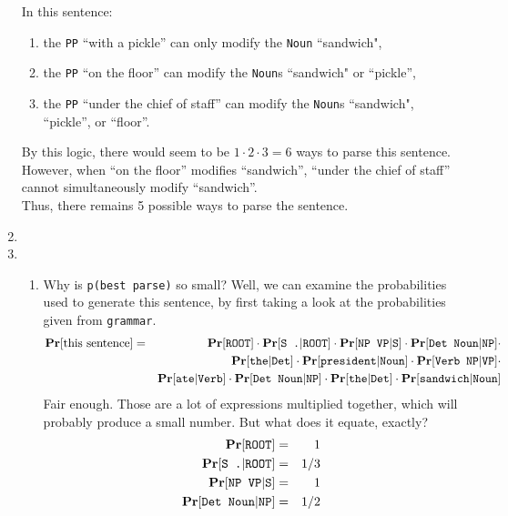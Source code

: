 \documentclass[11pt]{article}
\newcommand{\prob}[1]{\ensuremath{\text{{\bf Pr}$\left[#1\right]$}}}
\newcommand{\code}[1]{\texttt{#1}}
\begin{document}
\begin{enumerate}
	In this sentence:
	\begin{enumerate}[label=(\roman*)]
	\item the \code{PP} ``with a pickle'' can only modify the \code{Noun} ``sandwich",
	\item the \code{PP} ``on the floor'' can modify the \code{Noun}s ``sandwich" or ``pickle'',
	\item the \code{PP} ``under the chief of staff'' can modify the \code{Noun}s ``sandwich", ``pickle'', or ``floor''.
	\end{enumerate}
	By this logic, there would seem to be $1 \cdot 2 \cdot 3 = 6$ ways to parse this sentence. \vspace{4pt} \\
	However, when ``on the floor'' modifies ``sandwich'', ``under the chief of staff'' cannot simultaneously modify ``sandwich''. \vspace{4pt} \\
	Thus, there remains 5 possible ways to parse the sentence.
\item
\item
	\begin{enumerate}[label=(\roman*)]
	\item
		Why is \code{p(best parse)} so small? Well, we can examine the probabilities used to generate this sentence, by first taking a look at the probabilities given from \code{grammar}.
		\begin{eqnarray*}
			\prob{\text{this sentence}} &=&  \prob{\code{ROOT}} \cdot \prob{\code{S .} | \code{ROOT}} \cdot \prob{\code{NP VP} | \code{S}} \cdot \prob{\code{Det Noun} | \code{NP}} \cdot \\
			&& \prob{\code{the} | \code{Det}} \cdot \prob{\code{president} | \code{Noun}} \cdot \prob{\code{Verb NP} | \code{VP}} \cdot \\
			&& \prob{\code{ate} | \code{Verb}} \cdot \prob{\code{Det Noun} | \code{NP}} \cdot \prob{\code{the} | \code{Det}} \cdot \prob{\code{sandwich} | \code{Noun}}
		\end{eqnarray*}
		Fair enough. Those are a lot of expressions multiplied together, which will probably produce a small number. But what does it equate, exactly?
		\begin{eqnarray*}
			\prob{\code{ROOT}}             &=& 1 \\
			\prob{\code{S .} | \code{ROOT}} &=& 1/3 \\
                        	\prob{\code{NP VP} | \code{S}}        &=& 1 \\
                        	\prob{\code{Det Noun} | \code{NP}}    &=& 1/2 \\

\end{eqnarray*}
\end{enumerate}
\end{enumerate}
\end{document}
